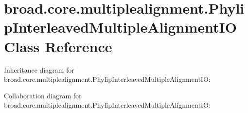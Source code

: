 \hypertarget{classbroad_1_1core_1_1multiplealignment_1_1_phylip_interleaved_multiple_alignment_i_o}{\section{broad.\+core.\+multiplealignment.\+Phylip\+Interleaved\+Multiple\+Alignment\+I\+O Class Reference}
\label{classbroad_1_1core_1_1multiplealignment_1_1_phylip_interleaved_multiple_alignment_i_o}
}


Inheritance diagram for broad.\+core.\+multiplealignment.\+Phylip\+Interleaved\+Multiple\+Alignment\+I\+O\+:


Collaboration diagram for broad.\+core.\+multiplealignment.\+Phylip\+Interleaved\+Multiple\+Alignment\+I\+O\+:
